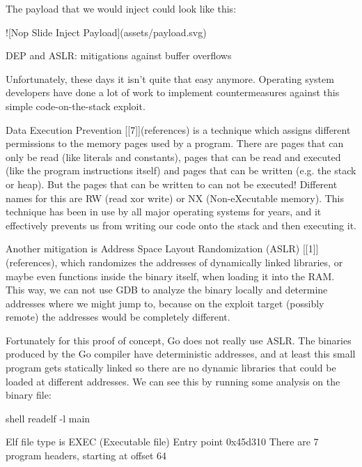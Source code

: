 The payload that we would inject could look like this:

![Nop Slide Inject Payload](assets/payload.svg)


 DEP and ASLR: mitigations against buffer overflows

Unfortunately, these days it isn't quite that easy anymore. Operating system developers have done a lot of work to
implement countermeasures against this simple code-on-the-stack exploit.

Data Execution Prevention [[7]](references) is a technique which assigns different permissions to the memory pages used by a program. There
are pages that can only be read (like literals and constants), pages that can be read and executed (like the program
instructions itself) and pages that can be written (e.g. the stack or heap). But the pages that can be written to can
not be executed! Different names for this are RW (read xor write) or NX (Non-eXecutable memory). This technique has been in
use by all major operating systems for years, and it effectively prevents us from writing our code onto the stack and
then executing it.

Another mitigation is Address Space Layout Randomization (ASLR) [[1]](references), which randomizes the addresses of dynamically linked
libraries, or maybe even functions inside the binary itself, when loading it into the RAM. This way, we can not use GDB
to analyze the binary locally and determine addresses where we might jump to, because on the exploit target (possibly
remote) the addresses would be completely different.

Fortunately for this proof of concept, Go does not really use ASLR. The binaries produced by the Go compiler have
deterministic addresses, and at least this small program gets statically linked so there are no dynamic libraries that
could be loaded at different addresses. We can see this by running some analysis on the binary file:

shell
 readelf -l main

Elf file type is EXEC (Executable file)
Entry point 0x45d310
There are 7 program headers, starting at offset 64

